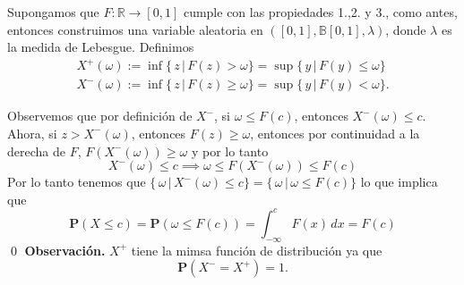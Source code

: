 \documentclass[letterpaper]{book}
\newcommand{\prob}{\textbf{P}}
\newcommand{\obs}{{\newline \noindent \sc \textbf{Observación. }}}
\newcommand{\re}{\ensuremath{\mathbb R }}
\begin{document}
Supongamos que \(F:\re\rightarrow[0,1]\) cumple con las propiedades 1.,2. y 3., como antes, entonces construimos una variable aleatoria en \(([0,1],\mathbb{B}[0,1],\lambda)\), donde \(\lambda\) es la medida de Lebesgue. Definimos
\begin{align*}
    X^{+}(\omega):=\inf\{\,z\,\vert\,F(z)>\omega\}=\sup\{\,y\,\vert\,F(y)\leq\omega\}\\
    X^{-}(\omega):=\inf\{\,z\,\vert\,F(z)\geq\omega\}=\sup\{\,y\,\vert\,F(y)<\omega\}.
\end{align*}

Observemos que por definición de \(X^{-}\), si \(\omega\leq F(c)\), entonces \(X^{-}(\omega)\leq c\). Ahora, si \(z>X^{-}(\omega)\), entonces \(F(z)\geq\omega\), entonces por continuidad a la derecha de \(F\), \(F(X^{-}(\omega))\geq\omega\) y por lo tanto
\[
     X^{-}(\omega)\leq c \implies \omega\leq F(X^{-}(\omega))\leq F(c)
\]
Por lo tanto tenemos que \(\{\,\omega\,\vert\,X^{-}(\omega)\leq c\}=\{\,\omega\,\vert\,\omega\leq F(c)\}\) lo que implica que
\[
    \prob(X\leq c)=\prob(\omega\leq F(c))=\int_{-\infty}^c F(x)\,dx=F(c)
\]
\qed
\obs \(X^{+}\) tiene la mimsa función de distribución ya que
\[
\prob(X^{-} = X^{+})=1.
\]
\end{document}
